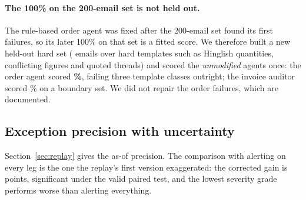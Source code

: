 \paragraph{The 100\% on the 200-email set is not held out.} The rule-based order agent was fixed after the 200-email set found its first failures, so its later 100\% on that set is a fitted score. We therefore built a new held-out hard set (\fzHardOrderCases{} emails over hard templates such as Hinglish quantities, conflicting figures and quoted threads) and scored the \emph{unmodified} agents once: the order agent scored \textbf{\fzHardOrderRulesPct{}\%}, failing three template classes outright; the invoice auditor scored \fzHardInvoiceRulesPct{}\% on a boundary set. We did not repair the order failures, which are documented.

\subsection{Exception precision with uncertainty}\label{sec:exception}
Section~\ref{sec:replay} gives the as-of precision. The comparison with alerting on every leg is the one the replay's first version exaggerated: the corrected gain is \fzExcGainPointsDpTwo{} points, significant under the valid paired test, and the lowest severity grade performs worse than alerting everything.

